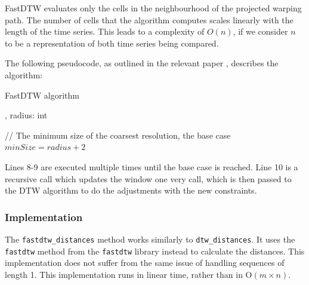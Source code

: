 \documentclass[final,rdr32.tex]{subfiles}
\begin{document}
FastDTW evaluates only the cells in the neighbourhood of the projected warping path. The number of cells that the algorithm computes scales linearly with the length of the time series. This leads to a complexity of $O(n)$, if we consider $n$ to be a representation of both time series being compared.

The following pseudocode, as outlined in the relevant paper \cite{salvador2007toward}, describes the algorithm:\\

\begin{algorithm}[H]
    \caption{FastDTW algorithm}

    , radius: int \\

    // The minimum size of the coarsest resolution, the base case\\
    $minSize = radius+2$

\end{algorithm}
\bigskip
Lines 8-9 are executed multiple times until the base case is reached. Line 10 is a recursive call which updates the window one very call, which is then passed to the DTW algorithm to do the adjustments with the new constraints.

\subsubsection{Implementation}

The \verb|fastdtw_distances| method works similarly to \verb|dtw_distances|. It uses the \verb|fastdtw| method from the \verb|fastdtw| library instead to calculate the distances. This implementation does not suffer from the same issue of handling sequences of length 1. This implementation runs in linear time, rather than in O$(m \times n)$.
\end{document}
